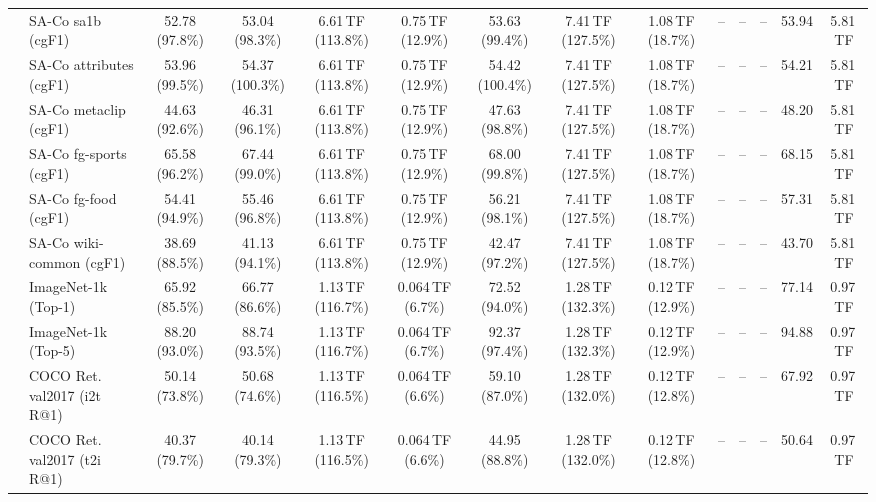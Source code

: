 \begin{table}[t]
\begin{center}
\begin{small}
\begin{sc}
{\begin{tabular}{llcccccccccccc}
& SA-Co sa1b (cgF1) & 52.78 (97.8\%) & 53.04 (98.3\%) & 6.61\,TF (113.8\%) & 0.75\,TF (12.9\%) & 53.63 (99.4\%) & 7.41\,TF (127.5\%) & 1.08\,TF (18.7\%) & -- & -- & -- & 53.94 & 5.81\,TF \\
& SA-Co attributes (cgF1) & 53.96 (99.5\%) & 54.37 (100.3\%) & 6.61\,TF (113.8\%) & 0.75\,TF (12.9\%) & 54.42 (100.4\%) & 7.41\,TF (127.5\%) & 1.08\,TF (18.7\%) & -- & -- & -- & 54.21 & 5.81\,TF \\
& SA-Co metaclip (cgF1) & 44.63 (92.6\%) & 46.31 (96.1\%) & 6.61\,TF (113.8\%) & 0.75\,TF (12.9\%) & 47.63 (98.8\%) & 7.41\,TF (127.5\%) & 1.08\,TF (18.7\%) & -- & -- & -- & 48.20 & 5.81\,TF \\
& SA-Co fg-sports (cgF1) & 65.58 (96.2\%) & 67.44 (99.0\%) & 6.61\,TF (113.8\%) & 0.75\,TF (12.9\%) & 68.00 (99.8\%) & 7.41\,TF (127.5\%) & 1.08\,TF (18.7\%) & -- & -- & -- & 68.15 & 5.81\,TF \\
& SA-Co fg-food (cgF1) & 54.41 (94.9\%) & 55.46 (96.8\%) & 6.61\,TF (113.8\%) & 0.75\,TF (12.9\%) & 56.21 (98.1\%) & 7.41\,TF (127.5\%) & 1.08\,TF (18.7\%) & -- & -- & -- & 57.31 & 5.81\,TF \\
& SA-Co wiki-common (cgF1) & 38.69 (88.5\%) & 41.13 (94.1\%) & 6.61\,TF (113.8\%) & 0.75\,TF (12.9\%) & 42.47 (97.2\%) & 7.41\,TF (127.5\%) & 1.08\,TF (18.7\%) & -- & -- & -- & 43.70 & 5.81\,TF \\
\midrule
{}
& ImageNet-1k (Top-1) & 65.92 (85.5\%) & 66.77 (86.6\%) & 1.13\,TF (116.7\%) & 0.064\,TF (6.7\%) & 72.52 (94.0\%) & 1.28\,TF (132.3\%) & 0.12\,TF (12.9\%) & -- & -- & -- & 77.14 & 0.97\,TF \\
& ImageNet-1k (Top-5) & 88.20 (93.0\%) & 88.74 (93.5\%) & 1.13\,TF (116.7\%) & 0.064\,TF (6.7\%) & 92.37 (97.4\%) & 1.28\,TF (132.3\%) & 0.12\,TF (12.9\%) & -- & -- & -- & 94.88 & 0.97\,TF \\
& COCO Ret. val2017 (i2t R@1) & 50.14 (73.8\%) & 50.68 (74.6\%) & 1.13\,TF (116.5\%) & 0.064\,TF (6.6\%) & 59.10 (87.0\%) & 1.28\,TF (132.0\%) & 0.12\,TF (12.8\%) & -- & -- & -- & 67.92 & 0.97\,TF \\
& COCO Ret. val2017 (t2i R@1) & 40.37 (79.7\%) & 40.14 (79.3\%) & 1.13\,TF (116.5\%) & 0.064\,TF (6.6\%) & 44.95 (88.8\%) & 1.28\,TF (132.0\%) & 0.12\,TF (12.8\%) & -- & -- & -- & 50.64 & 0.97\,TF \\

\end{tabular}}
\end{sc}
\end{small}
\end{center}
\end{table}
